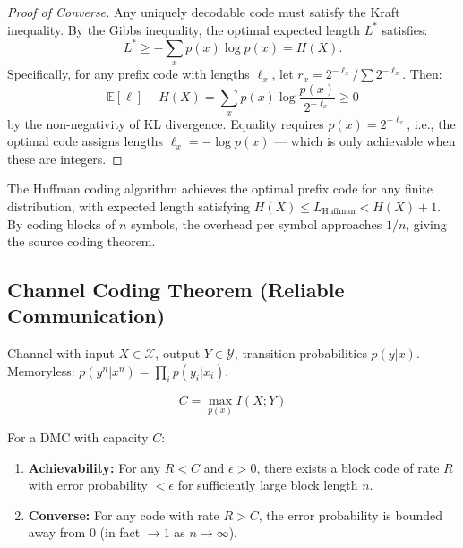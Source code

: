 \begin{proof}[Proof of Converse]
Any uniquely decodable code must satisfy the Kraft inequality. By the Gibbs inequality, the optimal expected length $L^*$ satisfies:
\[
L^* \ge -\sum_x p(x)\log p(x) = H(X).
\]
Specifically, for any prefix code with lengths $\ell_x$, let $r_x = 2^{-\ell_x}/\sum 2^{-\ell_x}$. Then:
\[
\mathbb{E}[\ell] - H(X) = \sum_x p(x)\log\frac{p(x)}{2^{-\ell_x}} \ge 0
\]
by the non-negativity of KL divergence. Equality requires $p(x) = 2^{-\ell_x}$, i.e., the optimal code assigns lengths $\ell_x = -\log p(x)$ — which is only achievable when these are integers.
\end{proof}

The Huffman coding algorithm achieves the optimal prefix code for any finite distribution, with expected length satisfying $H(X) \le L_{\text{Huffman}} < H(X) + 1$. By coding blocks of $n$ symbols, the overhead per symbol approaches $1/n$, giving the source coding theorem.

\subsection{Channel Coding Theorem (Reliable Communication)}
\label{sec:information:channel}

\begin{definition}
Channel with input $X \in \mathcal{X}$, output $Y \in \mathcal{Y}$, transition probabilities $p(y|x)$. Memoryless: $p(y^n|x^n) = \prod_i p(y_i|x_i)$.
\end{definition}

\begin{definition}
\[
C = \max_{p(x)} I(X;Y)
\]
\end{definition}

\begin{theorem}
For a DMC with capacity $C$:
\begin{enumerate}
\item \textbf{Achievability:} For any $R < C$ and $\epsilon > 0$, there exists a block code of rate $R$ with error probability $< \epsilon$ for sufficiently large block length $n$.
\item \textbf{Converse:} For any code with rate $R > C$, the error probability is bounded away from 0 (in fact $\to 1$ as $n \to \infty$).
\end{enumerate}
\end{theorem}

